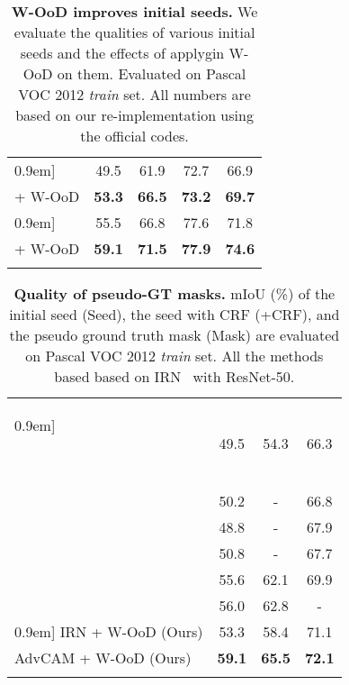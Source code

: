 \documentclass[10pt,twocolumn,letterpaper]{article}
\begin{document}
\begin{table}[tbp]
\renewcommand{\arraystretch}{0.92}
  \centering
  \caption{\textbf{W-OoD improves initial seeds.} We evaluate the qualities of various initial seeds and the effects of applygin W-OoD on them. 
Evaluated on Pascal VOC 2012 \textit{train} set. All numbers are based on our re-implementation using the official codes.}
  \vspace{-0.7em}
    \begin{tabular}{l@{\hskip 0.07in}cc@{\hskip 0.12in}c@{\hskip 0.07in}c}
     \Xhline{1pt}\-0.9em]
    ~\cite{ahn2018learning} & 49.5  & 61.9 & 72.7  & 66.9\\
    + W-OoD  & \textbf{53.3}  & \textbf{66.5} & \textbf{73.2} & \textbf{69.7}  \\
    \hline \-0.9em]
    ~\cite{lee2021anti} & 55.5  & 66.8 & 77.6 & 71.8  \\
    + W-OoD  & \textbf{59.1} & \textbf{71.5} & \textbf{77.9} & \textbf{74.6}  \\
\Xhline{1pt}
    \vspace{-1.8em}
    \end{tabular}\label{seed_improve}\end{table} \begin{table}[tbp]
\renewcommand{\arraystretch}{0.95}
  \centering
  \caption{\textbf{Quality of pseudo-GT masks.} mIoU (\%) of the initial seed (Seed), the seed with CRF (+CRF), and the pseudo ground truth mask (Mask) are evaluated on Pascal VOC 2012 \textit{train} set. All the methods based based on IRN~\cite{ahn2019weakly} with ResNet-50.}
  \vspace{-0.7em}
    \begin{tabular}{l@{\hskip 0.3in}c@{\hskip 0.1in}c@{\hskip 0.08in}c}
     \Xhline{1pt}\-0.9em]


~\cite{ahn2019weakly} & 49.5  & 54.3 & 66.3 \\
    ~\cite{liu2020weakly} & 50.2 & - & 66.8 \\
    ~\cite{zhang2020causal} & 48.8 & - & 67.9 \\
    ~\cite{su2021context} & 50.8  & - & 67.7 \\
    ~\cite{lee2021anti} & 55.6  & 62.1 & 69.9 \\
    ~\cite{kweon2021unlocking} & 56.0  & 62.8 & - \\


\-0.9em]
    IRN + W-OoD (Ours)  & 53.3 & 58.4 & 71.1  \\
    AdvCAM + W-OoD (Ours)  & \textbf{59.1} & \textbf{65.5} &\textbf{72.1}  \\

    \Xhline{1pt}
    \vspace{-2em}
    \end{tabular}\label{table_seed}\end{table}%
\end{document}
